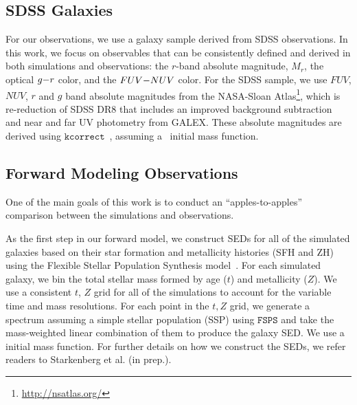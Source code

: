 \subsection{SDSS Galaxies} \label{sec:obs} 
For our observations, we use a galaxy sample derived from SDSS observations. 
In this work, we focus 
on observables that can be consistently defined and derived in both simulations 
and observations: the $r$-band absolute magnitude, $M_r$, the optical $g{-}r$
color, and the $FUV{-}NUV$ color. For the SDSS sample, we use $FUV$,
$NUV$, $r$ and $g$ band absolute magnitudes from the NASA-Sloan
Atlas\footnote{\url{http://nsatlas.org/}}, which is re-reduction of SDSS DR8
\citep{aihara2011} that includes an improved background subtraction~\citep{blanton2011} 
and near and far UV photometry from GALEX. These absolute magnitudes are
derived using $\mathtt{kcorrect}$~\citep{blanton2007a}, assuming
a~\cite{chabrier2003} initial mass function. 

\subsection{Forward Modeling Observations} \label{sec:fm} 
One of the main goals of this work is to conduct an ``apples-to-apples''
comparison between the simulations and observations. 

As the first step in our forward model, we construct SEDs for all
of the simulated galaxies based on their star formation and metallicity
histories (SFH and ZH) using the Flexible Stellar Population Synthesis
model~\citep[$\mathtt{FSPS}$;][]{conroy2009, conroy2010}. For each simulated
galaxy, we bin the total stellar mass formed by age ($t$) and metallicity
($Z$). We use a consistent $t$, $Z$ grid for all of the simulations
to account for the variable time and mass resolutions. For each point in the
$t, Z$ grid, we generate a spectrum assuming a simple stellar population (SSP)
using $\mathtt{FSPS}$ and take the mass-weighted linear combination of them to
produce the galaxy SED. We use a
\cite{chabrier2003} initial mass function. For further details on how we
construct the SEDs, we refer readers to Starkenberg et al. (in prep.).

